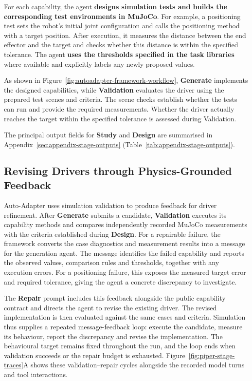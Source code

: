 For each capability, the agent \textbf{designs simulation tests and builds the
corresponding test environments in MuJoCo}. For example, a positioning test
sets the robot's initial joint configuration and calls the positioning method
with a target position. After execution, it measures the distance between the
end effector and the target and checks whether this distance is within the
specified tolerance. The agent \textbf{uses the thresholds specified in the
task libraries} where available and explicitly labels any newly proposed
values.

As shown in Figure~\ref{fig:autoadapter-framework-workflow}, \textbf{Generate}
implements the designed capabilities, while \textbf{Validation} evaluates the
driver using the prepared test scenes and criteria. The scene checks establish
whether the tests can run and provide the required measurements. Whether the
driver actually reaches the target within the specified tolerance is assessed
during Validation.

The principal output fields for \textbf{Study} and \textbf{Design} are
summarised in Appendix~\ref{sec:appendix-stage-outputs}
(Table~\ref{tab:appendix-stage-outputs}).

\subsection{Revising Drivers through Physics-Grounded Feedback}

Auto-Adapter uses simulation validation to produce feedback for driver
refinement. After \textbf{Generate} submits a candidate, \textbf{Validation}
executes its capability methods and compares independently recorded MuJoCo
measurements with the criteria established during \textbf{Design}.
For a repairable failure, the framework converts the
case diagnostics and measurement results into a message for the generation
agent. The message identifies the failed capability and reports the observed
values, comparison rules and thresholds, together with any execution errors.
For a positioning failure, this exposes the measured target error and required
tolerance, giving the agent a concrete discrepancy to investigate.

The \textbf{Repair} prompt includes this feedback alongside the public
capability contract and directs the agent to revise the existing driver. The
revised implementation is then evaluated against the same cases and criteria.
Simulation thus supplies a repeated message-feedback loop: execute the
candidate, measure its behaviour, report the discrepancy and revise the
implementation. The behavioural target remains fixed throughout the run, and
the loop ends when validation succeeds or the repair budget is exhausted.
Figure~\ref{fig:piper-stage-traces}A shows these validation--repair cycles
alongside the recorded model turns and tool interactions.


